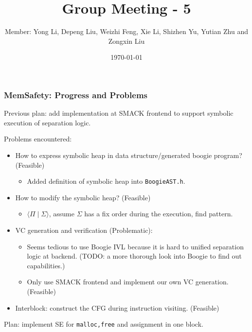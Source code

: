 \documentclass[aspectratio=1610, 13pt]{beamer}
\title{Group Meeting - 5}
\date{\today}
\author{Member: Yong Li, Depeng Liu, Weizhi Feng, Xie Li, Shizhen Yu, Yutian Zhu and Zongxin Liu}
\begin{document}
\maketitle

\begin{frame}\frametitle{MemSafety: Progress and Problems}
Previous plan: add implementation at SMACK frontend to support symbolic execution of separation logic.

Problems encountered: 
\begin{itemize}
\item How to express symbolic heap in data structure/generated boogie program? (Feasible)
\begin{itemize}
\item Added definition of symbolic heap into \texttt{BoogieAST.h}.

\end{itemize}

\item How to modify the symbolic heap? (Feasible)
\begin{itemize}
\item $\langle \Pi \mid \Sigma\rangle$, assume $\Sigma$ has a fix order during the execution, find pattern.


\end{itemize}
\item VC generation and verification (Problematic):
\begin{itemize}
\item Seems tedious to use Boogie IVL because it is hard to unified separation logic at backend. (TODO: a more thorough look into Boogie to find out capabilities.)
\item Only use SMACK frontend and implement our own VC generation. (Feasible)
\end{itemize} 
\item Interblock: construct the CFG during instruction visiting. (Feasible)

\end{itemize}

Plan: implement SE for \texttt{malloc,free} and assignment in one block.
\end{frame}
\end{document}
